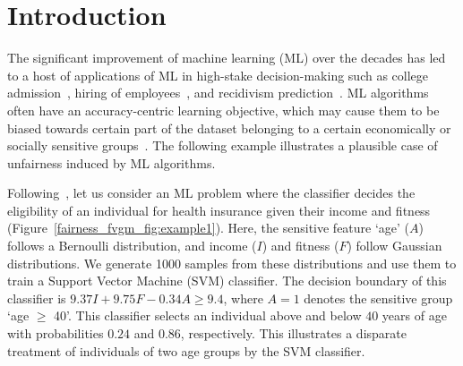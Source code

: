 \section{Introduction}
	The significant improvement of machine learning (ML) over the decades has led to a host of applications of ML in  high-stake decision-making such as college admission~\cite{martinez2021using}, hiring of employees~\cite{ajunwa2016hiring}, and recidivism prediction~\cite{tollenaar2013method,dressel2018accuracy}. ML algorithms often have an accuracy-centric learning objective, which may cause them to be biased towards certain part of the dataset belonging to a certain economically or socially sensitive groups~\cite{landy1978correlates,zliobaite2015relation,berk2019accuracy}.
	 The following example illustrates a plausible case of unfairness induced by ML algorithms. 
	\begin{example}\label{fairness_fvgm_example:intro}
		Following~\cite[Example 1.]{ghosh2020justicia}, let us consider an ML problem where the classifier decides the eligibility of an individual for health insurance given their income and fitness (Figure~\ref{fairness_fvgm_fig:example1}). Here, the sensitive feature `age' ($ A $) follows a Bernoulli distribution, and income ($ I $) and fitness ($ F $) follow Gaussian distributions. We generate 1000 samples from these distributions and use them to train a Support Vector Machine (SVM) classifier. The decision boundary of this classifier is $9.37I + 9.75F - 0.34A \ge 9.4$, where $A = 1$ denotes the sensitive group `age $ \ge $ 40'. This classifier selects an individual above and below $40$ years of age with probabilities $0.24$ and $0.86$, respectively. This illustrates a disparate treatment of individuals of two age groups by the SVM classifier. 
	\end{example}

